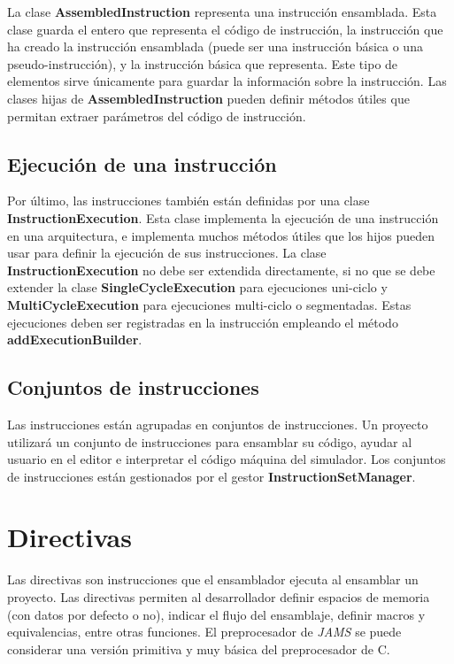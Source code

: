 La clase \textbf{AssembledInstruction} representa una instrucción ensamblada.
Esta clase guarda el entero que representa el código de instrucción,
la instrucción que ha creado la instrucción ensamblada
(puede ser una instrucción básica o una pseudo-instrucción),
y la instrucción básica que representa.
Este tipo de elementos sirve únicamente para guardar
la información sobre la instrucción.
Las clases hijas de \textbf{AssembledInstruction} pueden definir métodos útiles
que permitan extraer parámetros del código de instrucción.

\subsection{Ejecución de una instrucción}\label{subsec:ejecución-de-una-instruccion}

Por último, las instrucciones también están definidas por una clase
\textbf{InstructionExecution}.
Esta clase implementa la ejecución de una instrucción en una arquitectura,
e implementa muchos métodos útiles que los hijos pueden usar para definir
la ejecución de sus instrucciones.
La clase \textbf{InstructionExecution} no debe ser extendida directamente,
si no que se debe extender la clase \textbf{SingleCycleExecution}
para ejecuciones uni-ciclo y \textbf{MultiCycleExecution} para ejecuciones
multi-ciclo o segmentadas.
Estas ejecuciones deben ser registradas en la instrucción
empleando el método \textbf{addExecutionBuilder}.

\subsection{Conjuntos de instrucciones}\label{subsec:conjuntos-de-instrucciones}

Las instrucciones están agrupadas en conjuntos de instrucciones.
Un proyecto utilizará un conjunto de instrucciones para ensamblar su código,
ayudar al usuario en el editor e interpretar el código máquina del simulador.
Los conjuntos de instrucciones están gestionados por el gestor
\textbf{InstructionSetManager}.


\section{Directivas}\label{sec:directivas}

Las directivas son instrucciones que el ensamblador ejecuta al
ensamblar un proyecto.
Las directivas permiten al desarrollador definir espacios de memoria
(con datos por defecto o no), indicar el flujo del ensamblaje,
definir macros y equivalencias, entre otras funciones.
El preprocesador de \textit{JAMS} se puede considerar una versión primitiva
y muy básica del preprocesador de C\cite{C_PREPROCESSOR}.

